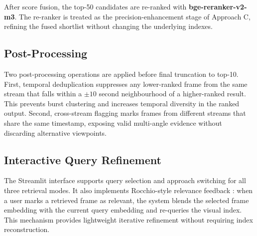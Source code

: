 After score fusion, the top-50 candidates are re-ranked with \textbf{bge-reranker-v2-m3}. The re-ranker is treated as the precision-enhancement stage of Approach C, refining the fused shortlist without changing the underlying indexes.

\subsection{Post-Processing}
\label{sec:postprocessing}

Two post-processing operations are applied before final truncation to top-10. First, temporal deduplication suppresses any lower-ranked frame from the same stream that falls within a $\pm 10$ second neighbourhood of a higher-ranked result. This prevents burst clustering and increases temporal diversity in the ranked output. Second, cross-stream flagging marks frames from different streams that share the same timestamp, exposing valid multi-angle evidence without discarding alternative viewpoints.

\subsection{Interactive Query Refinement}
\label{sec:interactive}

The Streamlit interface supports query selection and approach switching for all three retrieval modes. It also implements Rocchio-style relevance feedback \cite{rocchio1971relevance}: when a user marks a retrieved frame as relevant, the system blends the selected frame embedding with the current query embedding and re-queries the visual index. This mechanism provides lightweight iterative refinement without requiring index reconstruction.
